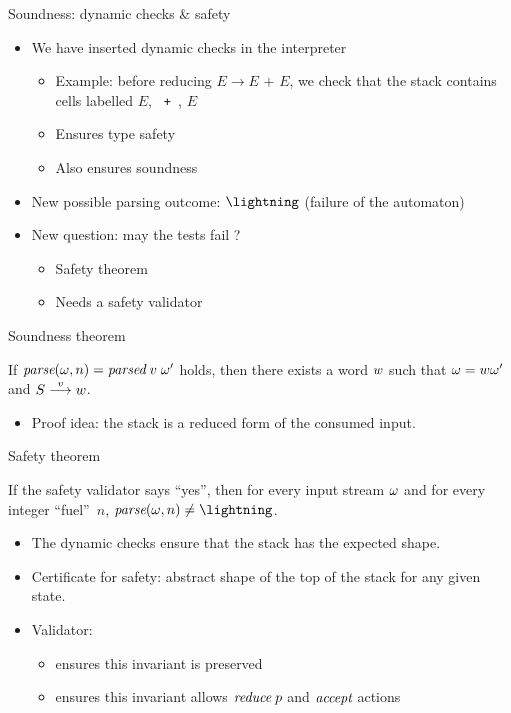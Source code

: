 \documentclass{beamer}
\begin{document}
\begin{frame}{Soundness: dynamic checks \& safety}
  \begin{itemize}
  \item We have inserted dynamic checks in the interpreter
    \begin{itemize}
    \item Example: before reducing $E \rightarrow E\texttt{ + }E$, we check
      that the stack contains cells labelled $E$, \texttt{ + }, $E$
    \item Ensures type safety
    \item Also ensures soundness
    \end{itemize}
  \item New possible parsing outcome: $\Err$ (failure of the automaton)
  \item New question: may the tests fail ?
    \begin{itemize}
    \item Safety theorem
    \item Needs a safety validator
    \end{itemize}
  \end{itemize}
\end{frame}


\begin{frame}{Soundness theorem}
\begin{theorem}[Soundness]
\label{th:sound}
If $\textit{parse}(\omega, n) = \textit{parsed}\;v\;\omega'$ holds, then there exists a
word $w$ such that $\omega = w \omega'$ and $S\stackrel{v}{\longrightarrow}w$.
\end{theorem}
\begin{itemize}
\item Proof idea: the stack is a reduced form of the consumed input.
\end{itemize}
\end{frame}

\begin{frame}{Safety theorem}
\begin{theorem}[Safety]
\label{th:safety}
If the safety validator says ``yes'', then for every
input stream $\omega$ and for every integer ``fuel''~$n$,
$\parse{\stream}{n} \neq \Err$.
\end{theorem}
\begin{itemize}
\item The dynamic checks ensure that the stack has the expected
  shape.
\item Certificate for safety: abstract shape of the top of the stack for any given state.
\item Validator:
\begin{itemize}
\item ensures this invariant is preserved
\item ensures this invariant allows $\textit{reduce}\;p$ and $\textit{accept}$ actions
\end{itemize}
\end{itemize}
\end{frame}
\end{document}
